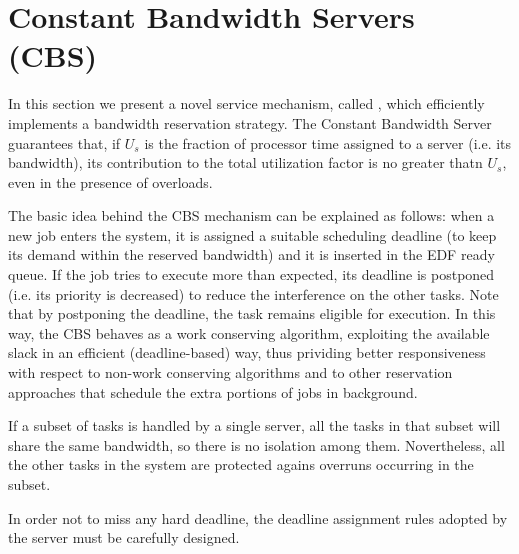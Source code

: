 \section{Constant Bandwidth Servers (CBS)}
In this section we present a novel service mechanism, called , which efficiently implements a bandwidth reservation strategy. The Constant Bandwidth Server guarantees that, if $U_s$ is the fraction of processor time assigned to a server (i.e. its bandwidth), its contribution to the total utilization factor is no greater thatn $U_s$, even in the presence of overloads. 

The basic idea behind the CBS mechanism can be explained as follows: when a new job enters the system, it is assigned a suitable scheduling deadline (to keep its demand within the reserved bandwidth) and it is inserted in the EDF ready queue. If the job tries to execute more than expected, its deadline is postponed (i.e. its priority is decreased) to reduce the interference on the other tasks. Note that by postponing the deadline, the task remains eligible for execution. In this way, the CBS behaves as a work conserving algorithm, exploiting the available slack in an efficient (deadline-based) way, thus prividing better responsiveness with respect to non-work conserving algorithms and to other reservation approaches that schedule the extra portions of jobs in background.

If a subset of tasks is handled by a single server, all the tasks in that subset will share the same bandwidth, so there is no isolation among them. Novertheless, all the other tasks in the system are protected agains overruns occurring in the subset.

In order not to miss any hard deadline, the deadline assignment rules adopted by the server must be carefully designed.


